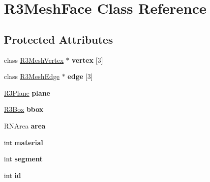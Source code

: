 \hypertarget{class_r3_mesh_face}{}\section{R3\+Mesh\+Face Class Reference}
\label{class_r3_mesh_face}
\subsection*{Protected Attributes}
\begin{DoxyCompactItemize}
\item 
class \hyperlink{class_r3_mesh_vertex}{R3\+Mesh\+Vertex} $\ast$ {\bfseries vertex} \mbox{[}3\mbox{]}\hypertarget{class_r3_mesh_face_aa85166d07f925bd3c6f14f1d2c926dbf}{}\label{class_r3_mesh_face_aa85166d07f925bd3c6f14f1d2c926dbf}

\item 
class \hyperlink{class_r3_mesh_edge}{R3\+Mesh\+Edge} $\ast$ {\bfseries edge} \mbox{[}3\mbox{]}\hypertarget{class_r3_mesh_face_a5bbc774efc3242bbb6809adb29dba545}{}\label{class_r3_mesh_face_a5bbc774efc3242bbb6809adb29dba545}

\item 
\hyperlink{class_r3_plane}{R3\+Plane} {\bfseries plane}\hypertarget{class_r3_mesh_face_a5dd85c93e5a7f852cc54e3c0b2df2f04}{}\label{class_r3_mesh_face_a5dd85c93e5a7f852cc54e3c0b2df2f04}

\item 
\hyperlink{class_r3_box}{R3\+Box} {\bfseries bbox}\hypertarget{class_r3_mesh_face_af45e13e6f8c6ad56caf2a17ee5717270}{}\label{class_r3_mesh_face_af45e13e6f8c6ad56caf2a17ee5717270}

\item 
R\+N\+Area {\bfseries area}\hypertarget{class_r3_mesh_face_a00c29a5838dd666c5dbefa4df5cf6b30}{}\label{class_r3_mesh_face_a00c29a5838dd666c5dbefa4df5cf6b30}

\item 
int {\bfseries material}\hypertarget{class_r3_mesh_face_a5232952b68b70d8c27d46aa54cfbfd5f}{}\label{class_r3_mesh_face_a5232952b68b70d8c27d46aa54cfbfd5f}

\item 
int {\bfseries segment}\hypertarget{class_r3_mesh_face_a8137c824e7419199e560e8c1f7ff7d81}{}\label{class_r3_mesh_face_a8137c824e7419199e560e8c1f7ff7d81}

\item 
int {\bfseries id}\hypertarget{class_r3_mesh_face_ac921a96fcc369f7d128e4571c8ef0200}{}\label{class_r3_mesh_face_ac921a96fcc369f7d128e4571c8ef0200}


\end{DoxyCompactItemize}
